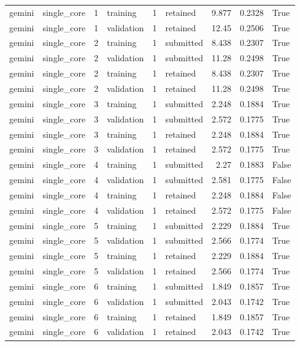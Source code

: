 \begin{tabular}{llrlrlrrl}
gemini & single\_core & 1 & training & 1 & retained & 9.877 & 0.2328 & True \\
gemini & single\_core & 1 & validation & 1 & retained & 12.45 & 0.2506 & True \\
gemini & single\_core & 2 & training & 1 & submitted & 8.438 & 0.2307 & True \\
gemini & single\_core & 2 & validation & 1 & submitted & 11.28 & 0.2498 & True \\
gemini & single\_core & 2 & training & 1 & retained & 8.438 & 0.2307 & True \\
gemini & single\_core & 2 & validation & 1 & retained & 11.28 & 0.2498 & True \\
gemini & single\_core & 3 & training & 1 & submitted & 2.248 & 0.1884 & True \\
gemini & single\_core & 3 & validation & 1 & submitted & 2.572 & 0.1775 & True \\
gemini & single\_core & 3 & training & 1 & retained & 2.248 & 0.1884 & True \\
gemini & single\_core & 3 & validation & 1 & retained & 2.572 & 0.1775 & True \\
gemini & single\_core & 4 & training & 1 & submitted & 2.27 & 0.1883 & False \\
gemini & single\_core & 4 & validation & 1 & submitted & 2.581 & 0.1775 & False \\
gemini & single\_core & 4 & training & 1 & retained & 2.248 & 0.1884 & False \\
gemini & single\_core & 4 & validation & 1 & retained & 2.572 & 0.1775 & False \\
gemini & single\_core & 5 & training & 1 & submitted & 2.229 & 0.1884 & True \\
gemini & single\_core & 5 & validation & 1 & submitted & 2.566 & 0.1774 & True \\
gemini & single\_core & 5 & training & 1 & retained & 2.229 & 0.1884 & True \\
gemini & single\_core & 5 & validation & 1 & retained & 2.566 & 0.1774 & True \\
gemini & single\_core & 6 & training & 1 & submitted & 1.849 & 0.1857 & True \\
gemini & single\_core & 6 & validation & 1 & submitted & 2.043 & 0.1742 & True \\
gemini & single\_core & 6 & training & 1 & retained & 1.849 & 0.1857 & True \\
gemini & single\_core & 6 & validation & 1 & retained & 2.043 & 0.1742 & True \\

\end{tabular}
